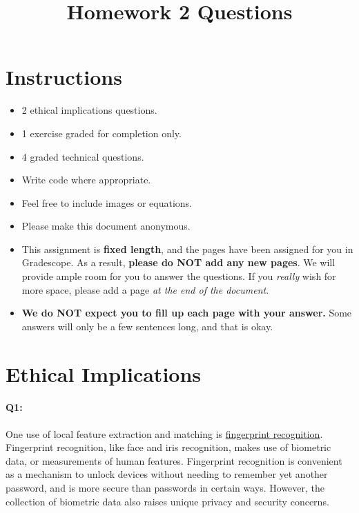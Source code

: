 \date{}

\title{\vspace{-1cm}Homework 2 Questions}



\maketitle
\vspace{-3cm}
\thispagestyle{fancy}

\section*{Instructions}
\begin{itemize}
  \item 2 ethical implications questions.
  \item 1 exercise graded for completion only.
  \item 4 graded technical questions.
  \item Write code where appropriate.
  \item Feel free to include images or equations.
  \item Please make this document anonymous.
  \item This assignment is \textbf{fixed length}, and the pages have been assigned for you in Gradescope. As a result, \textbf{please do NOT add any new pages}. We will provide ample room for you to answer the questions. If you \emph{really} wish for more space, please add a page \emph{at the end of the document}.
  \item \textbf{We do NOT expect you to fill up each page with your answer.} Some answers will only be a few sentences long, and that is okay.
\end{itemize}
\pagebreak
\section*{Ethical Implications}

\paragraph{Q1:} One use of local feature extraction and matching is \href{https://www.youtube.com/watch?v=xD88Qs_DZp4}{fingerprint recognition}. Fingerprint recognition, like face and iris recognition, makes use of biometric data, or measurements of human features. Fingerprint recognition is convenient as a mechanism to unlock devices without needing to remember yet another password, and is more secure than passwords in certain ways. However, the collection of biometric data also raises unique privacy and security concerns.

